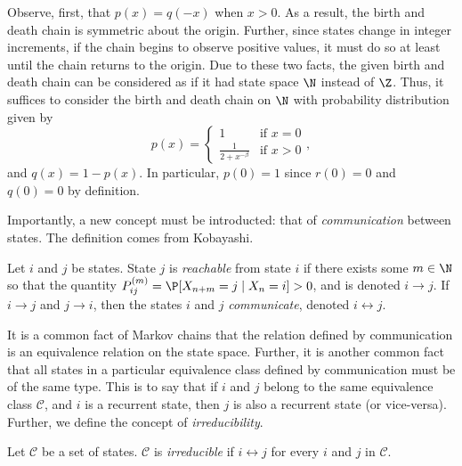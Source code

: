 Observe, first, that $p(x) = q(-x)$ when $x > 0$. As a result, the birth and death chain is symmetric
about the origin. Further, since states change in integer increments, if the chain begins to observe
positive values, it must do so at least until the chain returns to the origin. Due to these two facts,
the given birth and death chain can be considered as if it had state space $\N$ instead of $\Z$. Thus,
it suffices to consider the birth and death chain on $\N$ with probability distribution given by
\[
    p(x) = \begin{cases}
        1 & \text{if } x = 0 \\
        \frac{1}{2+x^{-\beta}} & \text{if } x > 0
    \end{cases},
\]
and $q(x) = 1 - p(x)$. In particular, $p(0) = 1$ since $r(0) = 0$ and $q(0) = 0$ by definition.

Importantly, a new concept must be introducted: that of \emph{communication} between states. The
definition comes from Kobayashi.
\begin{definition}
    Let $i$ and $j$ be states. State $j$ is \emph{reachable} from state $i$ if there exists some $m \in
    \N$ so that the quantity $P_{ij}^{(m)} = \P[X_{n+m} = j \mid X_n =i] > 0$, and is denoted $i \to j$.
    If $i \to j$ and $j \to i$, then the states $i$ and $j$ \emph{communicate}, denoted $i
    \leftrightarrow j$.
\end{definition}
It is a common fact of Markov chains that the relation defined by communication is an equivalence
relation on the state space. Further, it is another common fact that all states in a particular
equivalence class defined by communication must be of the same type. This is to say that if $i$ and $j$
belong to the same equivalence class $\mathcal{C}$, and $i$ is a recurrent state, then $j$ is also a
recurrent state (or vice-versa). Further, we define the concept of \emph{irreducibility}.
\begin{definition}
    Let $\mathcal{C}$ be a set of states. $\mathcal{C}$ is \emph{irreducible} if $i \leftrightarrow j$
    for every $i$ and $j$ in $\mathcal{C}$.
\end{definition}

